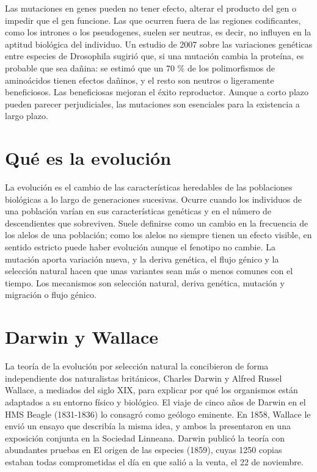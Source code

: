 \documentclass{book}
\begin{document}
Las mutaciones en genes pueden no tener efecto, alterar el producto del gen o impedir que el gen funcione. Las que ocurren fuera de las regiones codificantes, como los intrones o los pseudogenes, suelen ser neutras, es decir, no influyen en la aptitud biológica del individuo. Un estudio de 2007 sobre las variaciones genéticas entre especies de Drosophila sugirió que, si una mutación cambia la proteína, es probable que sea dañina: se estimó que un 70 \% de los polimorfismos de aminoácidos tienen efectos dañinos, y el resto son neutros o ligeramente beneficiosos. Las beneficiosas mejoran el éxito reproductor. Aunque a corto plazo pueden parecer perjudiciales, las mutaciones son esenciales para la existencia a largo plazo.


\section{Qué es la evolución}

La evolución es el cambio de las características heredables de las poblaciones biológicas a lo largo de generaciones sucesivas. Ocurre cuando los individuos de una población varían en sus características genéticas y en el número de descendientes que sobreviven. Suele definirse como un cambio en la frecuencia de los alelos de una población; como los alelos no siempre tienen un efecto visible, en sentido estricto puede haber evolución aunque el fenotipo no cambie. La mutación aporta variación nueva, y la deriva genética, el flujo génico y la selección natural hacen que unas variantes sean más o menos comunes con el tiempo. Los mecanismos son selección natural, deriva genética, mutación y migración o flujo génico.


\section{Darwin y Wallace}

La teoría de la evolución por selección natural la concibieron de forma independiente dos naturalistas británicos, Charles Darwin y Alfred Russel Wallace, a mediados del siglo XIX, para explicar por qué los organismos están adaptados a su entorno físico y biológico. El viaje de cinco años de Darwin en el HMS Beagle (1831-1836) lo consagró como geólogo eminente. En 1858, Wallace le envió un ensayo que describía la misma idea, y ambos la presentaron en una exposición conjunta en la Sociedad Linneana. Darwin publicó la teoría con abundantes pruebas en El origen de las especies (1859), cuyas 1250 copias estaban todas comprometidas el día en que salió a la venta, el 22 de noviembre.
\end{document}
